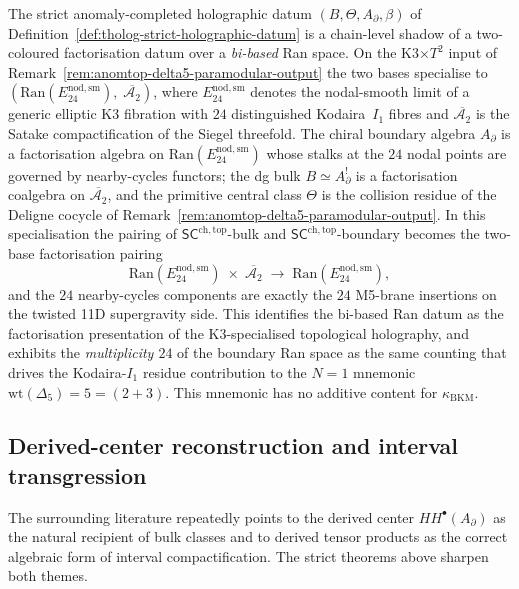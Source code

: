 \begin{remark}
\label{rem:anomtop-bibased-ran-24}
The strict anomaly-completed holographic datum
$(B,\Theta,A_{\partial},\beta)$ of
Definition~\ref{def:tholog-strict-holographic-datum} is a
chain-level shadow of a two-coloured factorisation datum over a
\emph{bi-based} Ran space. On the K3$\times T^{2}$ input of
Remark~\ref{rem:anomtop-delta5-paramodular-output} the two
bases specialise to
$(\mathrm{Ran}(E^{\mathrm{nod,sm}}_{24}),
\;\overline{\mathcal A_{2}})$,
where $E^{\mathrm{nod,sm}}_{24}$ denotes the nodal-smooth limit
of a generic elliptic K3 fibration with $24$ distinguished
Kodaira~$I_{1}$ fibres and $\overline{\mathcal A_{2}}$ is the
Satake compactification of the Siegel threefold. The chiral
boundary algebra $A_{\partial}$ is a factorisation algebra on
$\mathrm{Ran}(E^{\mathrm{nod,sm}}_{24})$ whose stalks at the
$24$ nodal points are governed by nearby-cycles functors; the
dg bulk $B\simeq A_{\partial}^{!}$ is a factorisation coalgebra
on $\overline{\mathcal A_{2}}$, and the primitive central
class $\Theta$ is the collision residue of the Deligne cocycle
of
Remark~\ref{rem:anomtop-delta5-paramodular-output}. In
this specialisation the pairing of
$\mathsf{SC}^{\mathrm{ch,top}}$-bulk and
$\mathsf{SC}^{\mathrm{ch,top}}$-boundary becomes the two-base
factorisation pairing
\[
\mathrm{Ran}(E^{\mathrm{nod,sm}}_{24})
\;\times\;
\overline{\mathcal A_{2}}
\;\longrightarrow\;
\mathrm{Ran}(E^{\mathrm{nod,sm}}_{24}),
\]
and the $24$ nearby-cycles components are exactly the
$24$ M5-brane insertions on the twisted 11D supergravity side.
This identifies the bi-based Ran datum as the factorisation
presentation of the K3-specialised topological holography, and
exhibits the \emph{multiplicity $24$} of the boundary Ran
space as the same counting that drives the Kodaira-$I_{1}$
residue contribution to the $N=1$ mnemonic
$\mathrm{wt}(\Delta_{5})=5=(2+3)$. This mnemonic has no additive
content for $\kappa_{\mathrm{BKM}}$.
\end{remark}

\subsection{Derived-center reconstruction and interval transgression}

The surrounding literature repeatedly points to the derived center \(HH^{\bullet}(A_{\partial})\) as the natural recipient of bulk classes and to derived tensor products as the correct algebraic form of interval compactification.
The strict theorems above sharpen both themes.

